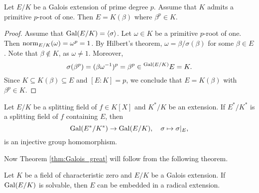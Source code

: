\begin{lemma}
\label{lem:E=K(beta)}
    Let $E/K$ be a Galois extension of prime degree $p$. Assume that $K$ admits a primitive $p$-root of one. 
    Then $E=K(\beta)$ where $\beta^p\in K$. 
\end{lemma}

\begin{proof}
    Assume that $\operatorname{Gal}(E/K)=\langle\sigma\rangle$. 
    Let $\omega\in K$ be a primitive $p$-root of one. Then $\operatorname{norm}_{E/K}(\omega)=\omega^p=1$. By Hilbert's theorem, 
    $\omega=\beta/\sigma(\beta)$ for some $\beta\in E$. Note that $\beta\not\in K$, as $\omega\ne1$. Moreover, 
    \[
    \sigma(\beta^p)=(\beta\omega^{-1})^p=\beta^p\in\prescript{\operatorname{Gal}(E/K)}{}{E}=K.
    \]
    Since $K\subseteq K(\beta)\subseteq E$ and $[E:K]=p$, we conclude that $E=K(\beta)$ with $\beta^p\in K$. 
\end{proof}

\begin{exercise}
\label{xca:embedding}
    Let $E/K$ be a splitting field of $f\in K[X]$ and $K^*/K$ be an extension.
    If $E^*/K^*$ is a splitting field of $f$ containing $E$, then 
    \[
    \operatorname{Gal}(E^*/K^*)\to\operatorname{Gal}(E/K),\quad \sigma\mapsto\sigma|_{E},
    \]
    is an injective group homomorphism. 
\end{exercise}

Now Theorem \ref{thm:Galois_great} will follow from the following theorem. 

\begin{theorem}
    Let $K$ be a field of characteristic zero and $E/K$ be a Galois extension.
    If $\operatorname{Gal}(E/K)$ is solvable, then $E$ can be embedded in a radical extension. 
\end{theorem}

